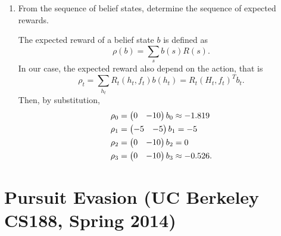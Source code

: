 \documentclass[11pt, a4paper]{article}
\begin{document}
\begin{enumerate}
    \item From the sequence of belief states, determine the sequence of expected rewards.

    \begin{solution}
        The expected reward of a belief state $b$ is defined as
        \begin{equation*}
            \rho(b) = \sum_s b(s) R(s) .
        \end{equation*}
        In our case, the expected reward also depend on the action, that is
        \begin{equation*}
            \rho_t = \sum_{h_t} R_t(h_t, f_t) b(h_t) = R_t(H_t, f_t)^T b_t.
        \end{equation*}
        Then, by substitution,
        \begin{align*}
            \rho_0 & = \begin{pmatrix}0 & -10\end{pmatrix} b_0 \approx -1.819 \\
            \rho_1 & = \begin{pmatrix}-5 & -5\end{pmatrix} b_1 = -5 \\
            \rho_2 & = \begin{pmatrix}0 & -10\end{pmatrix} b_2 = 0 \\
            \rho_3 & = \begin{pmatrix}0 & -10\end{pmatrix} b_3 \approx -0.526 .
        \end{align*}
    \end{solution}
\end{enumerate}

\newpage

\section{Pursuit Evasion (UC Berkeley CS188, Spring 2014)}
\end{document}
